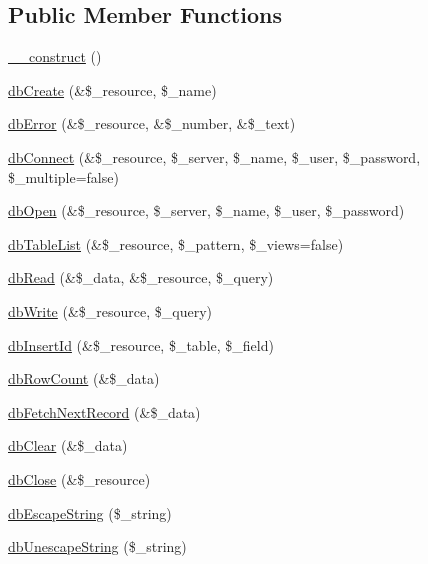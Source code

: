 \subsection*{Public Member Functions}
\begin{DoxyCompactItemize}
\item 
\hyperlink{classDbDriver_a0f4423a9599ea3197d97b110f6a4e3ee}{\_\-\_\-construct} ()
\item 
\hyperlink{classDbDriver_a3b044c35e3548effe3adf89bef5043e6}{dbCreate} (\&\$\_\-resource, \$\_\-name)
\item 
\hyperlink{classDbDriver_ac8a3d40046bf719aada5a1807a915589}{dbError} (\&\$\_\-resource, \&\$\_\-number, \&\$\_\-text)
\item 
\hyperlink{classDbDriver_a46e195260ab444a3223f578fbc6c22c9}{dbConnect} (\&\$\_\-resource, \$\_\-server, \$\_\-name, \$\_\-user, \$\_\-password, \$\_\-multiple=false)
\item 
\hyperlink{classDbDriver_a4747fcf9c24b722fd56c65111f9652dd}{dbOpen} (\&\$\_\-resource, \$\_\-server, \$\_\-name, \$\_\-user, \$\_\-password)
\item 
\hyperlink{classDbDriver_abe6928bd50a1115dc1e9e6b283d9b065}{dbTableList} (\&\$\_\-resource, \$\_\-pattern, \$\_\-views=false)
\item 
\hyperlink{classDbDriver_ac5343f76317816de2fb14e4a55eeb569}{dbRead} (\&\$\_\-data, \&\$\_\-resource, \$\_\-query)
\item 
\hyperlink{classDbDriver_a461f60524cd8d1dd23dd3c70ca5fcab7}{dbWrite} (\&\$\_\-resource, \$\_\-query)
\item 
\hyperlink{classDbDriver_a437f10c4bd4a651dc4694178da4ef65a}{dbInsertId} (\&\$\_\-resource, \$\_\-table, \$\_\-field)
\item 
\hyperlink{classDbDriver_a958aa47c21cc8db3ee7831e8b3fb1eb7}{dbRowCount} (\&\$\_\-data)
\item 
\hyperlink{classDbDriver_ab0faeafbd094c078e30929c884603833}{dbFetchNextRecord} (\&\$\_\-data)
\item 
\hyperlink{classDbDriver_a713cd43a5493bfcc0025523074568579}{dbClear} (\&\$\_\-data)
\item 
\hyperlink{classDbDriver_afa98f626bf20cb750d114857ba0a33e1}{dbClose} (\&\$\_\-resource)
\item 
\hyperlink{classDbDriver_accaa33441d852734b2213937612e66f6}{dbEscapeString} (\$\_\-string)
\item 
\hyperlink{classDbDriver_ac99fd7eba511d8799fcc447006179c72}{dbUnescapeString} (\$\_\-string)
\end{DoxyCompactItemize}


